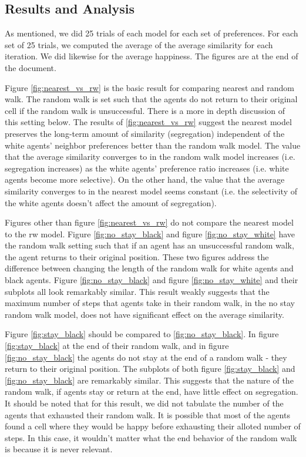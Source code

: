 \documentclass[11pt,twoside]{amsart}
\theoremstyle{theorem}
\theoremstyle{definition}
\theoremstyle{remark}
\begin{document}
\subsection{Results and Analysis}
As mentioned, we did 25 trials of each model for each set of preferences. 
For each set of 25 trials, we computed the average of the average similarity for each iteration. 
We did likewise for the average happiness. 
The figures are at the end of the document.

Figure \ref{fig:nearest_vs_rw} is the basic result for comparing nearest and random walk.
The random walk is set such that the agents do not return to their original cell if the random walk is unsuccessful. 
There is a more in depth discussion of this setting below. 
The results of \ref{fig:nearest_vs_rw} suggest the nearest model preserves the long-term amount of similarity (segregation) independent of the white agents' neighbor preferences better than the random walk model. 
The value that the average similarity converges to in the random walk model increases (i.e. segregation increases) as the white agents' preference ratio increases (i.e. white agents become more selective).
On the other hand, the value that the average similarity converges to in the nearest model seems constant (i.e. the selectivity of the white agents doesn't affect the amount of segregation).

Figures other than figure \ref{fig:nearest_vs_rw} do not compare the nearest model to the rw model. 
Figure \ref{fig:no_stay_black} and figure \ref{fig:no_stay_white} have the random walk setting such that if an agent has an unsuccessful random walk, the agent returns to their original position. 
These two figures address the difference between changing the length of the random walk for white agents and black agents. 
Figure \ref{fig:no_stay_black} and figure \ref{fig:no_stay_white} and their subplots all look remarkably similar.
This result weakly suggests that the maximum number of steps that agents take in their random walk, in the no stay random walk model, does not have significant effect on the average similarity.

Figure \ref{fig:stay_black} should be compared to \ref{fig:no_stay_black}. In figure \ref{fig:stay_black} at the end of their random walk, and in figure \ref{fig:no_stay_black} the agents do not stay at the end of a random walk - they return to their original position.
The subplots of both figure \ref{fig:stay_black} and \ref{fig:no_stay_black} are remarkably similar. 
This suggests that the nature of the random walk, if agents stay or return at the end, have little effect on segregation. 
It should be noted that for this result, we did not tabulate the number of the agents that exhausted their random walk. 
It is possible that most of the agents found a cell where they would be happy before exhausting their alloted number of steps. 
In this case, it wouldn't matter what the end behavior of the random walk is because it is never relevant. 
\end{document}
